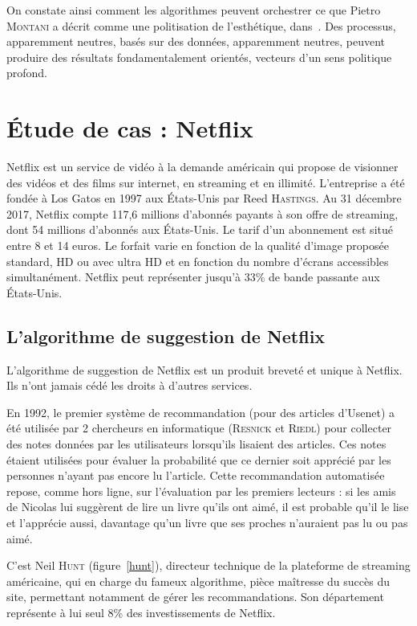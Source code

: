 \documentclass[a4paper,14pt]{extreport}
\begin{document}
On constate ainsi comment les algorithmes peuvent orchestrer ce que Pietro \textsc{Montani} a décrit comme une politisation de l'esthétique, dans~\cite{montani}. Des processus, apparemment neutres, basés sur des données, apparemment neutres, peuvent produire des résultats fondamentalement orientés, vecteurs d'un sens politique profond. 

\section{Étude de cas : Netflix}

Netflix est un service de vidéo à la demande américain qui propose de visionner des vidéos et des films sur internet, en streaming et en illimité. L'entreprise a été fondée à Los Gatos en 1997 aux États-Unis par Reed \textsc{Hastings}. Au 31 décembre 2017, Netflix compte 117,6 millions d'abonnés payants à son offre de streaming, dont 54 millions d'abonnés aux États-Unis. Le tarif d'un abonnement est situé entre 8 et 14 euros. Le forfait varie en fonction de la qualité d'image proposée standard, HD ou avec ultra HD et en fonction du nombre d'écrans accessibles simultanément. Netflix peut représenter jusqu'à 33\% de bande passante aux États-Unis.

\subsection{L'algorithme de suggestion de Netflix}

L'algorithme de suggestion de Netflix est un produit breveté et unique à Netflix. Ils n'ont jamais cédé les droits à d'autres services. 

En 1992, le premier système de recommandation (pour des articles d’Usenet) a été utilisée par 2 chercheurs en informatique (\textsc{Resnick} et \textsc{Riedl}) pour collecter des notes données par les utilisateurs lorsqu’ils lisaient des articles. Ces notes étaient utilisées pour évaluer la probabilité que ce dernier soit apprécié par les personnes n’ayant pas encore lu l'article. Cette recommandation automatisée repose, comme hors ligne, sur l’évaluation par les premiers lecteurs : si les amis de Nicolas lui suggèrent de lire un livre qu’ils ont aimé, il est probable qu’il le lise et l’apprécie aussi, davantage qu’un livre que ses proches n’auraient pas lu ou pas aimé.

C'est Neil \textsc{Hunt} (figure~\ref{hunt}), directeur technique de la plateforme de streaming américaine, qui en charge du fameux algorithme, pièce maîtresse du succès du site, permettant notamment de gérer les recommandations. Son département représente à lui seul 8\% des investissements de Netflix.
\end{document}
